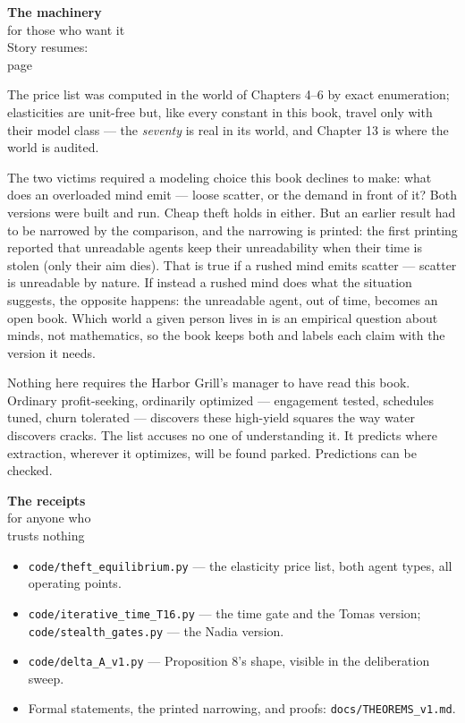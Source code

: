 \begin{machinery}{\textbf{The machinery}\\for those who want it\\[3pt]{\color{muted}Story resumes:\\page~\pageref{partIII}}}

The price list was computed in the world of Chapters 4--6 by exact
enumeration; elasticities are unit-free but, like every constant in
this book, travel only with their model class --- the \emph{seventy} is real
in its world, and Chapter 13 is where the world is audited.

The two victims required a modeling choice this book declines to make:
what does an overloaded mind emit --- loose scatter, or the demand in
front of it? Both versions were built and run. Cheap theft holds in
either. But an earlier result had to be narrowed by the comparison, and
the narrowing is printed: the first printing reported that
unreadable agents keep their unreadability when their time is stolen
(only their aim dies). That is true if a rushed mind emits scatter ---
scatter is unreadable by nature. If instead a rushed mind does what the
situation suggests, the opposite happens: the unreadable agent, out of
time, becomes an open book. Which world a given person lives in is an
empirical question about minds, not mathematics, so the book keeps
both and labels each claim with the version it needs.

Nothing here requires the Harbor Grill's manager to have read
this book. Ordinary profit-seeking, ordinarily optimized --- engagement
tested, schedules tuned, churn tolerated --- discovers these high-yield
squares the way water discovers cracks. The list accuses no one of
understanding it. It predicts where extraction, wherever it optimizes,
will be found parked. Predictions can be checked.

\end{machinery}

\begin{receipts}{\textbf{The receipts}\\for anyone who\\trusts nothing}


\begin{itemize}
\tightlist
\item
  \texttt{code/\allowbreak{}theft\_\allowbreak{}equilibrium.\allowbreak{}py} --- the elasticity price list, both agent
  types, all operating points.
\item
  \texttt{code/\allowbreak{}iterative\_\allowbreak{}time\_\allowbreak{}T16.\allowbreak{}py} --- the time gate and the Tomas version;
  \texttt{code/\allowbreak{}stealth\_\allowbreak{}gates.\allowbreak{}py} --- the Nadia version.
\item
  \texttt{code/\allowbreak{}delta\_\allowbreak{}A\_\allowbreak{}v1.\allowbreak{}py} --- Proposition 8's shape, visible in the
  deliberation sweep.
\item
  Formal statements, the printed narrowing, and proofs:
  \texttt{docs/\allowbreak{}THEOREMS\_\allowbreak{}v1.\allowbreak{}md}.
\end{itemize}

\end{receipts}

